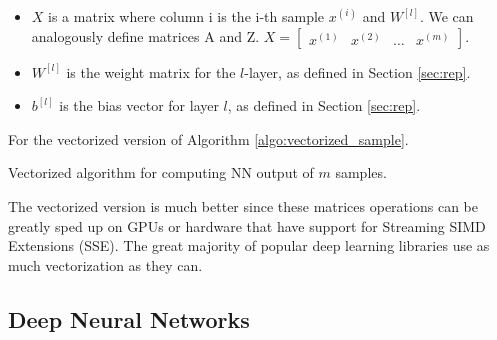 \begin{itemize}
    \item $X$ is a matrix where column i is the i-th sample $x^{(i)}$ and $W^{[l]}$. 
    We can analogously define matrices A and Z.
        $ X = \begin{bmatrix}
        x^{(1)} & x^{(2)} &  \dots  & x^{(m)} 
        \end{bmatrix}$.

    \item $W^{[l]}$ is the  weight matrix for the $l$-layer, as defined in Section \ref{sec:rep}. 
    \item $b^{[l]}$ is the bias vector for layer $l$, as defined in Section \ref{sec:rep}.
\end{itemize}

For the vectorized version of Algorithm \ref{algo:vectorized_sample}.

\begin{algorithm}[H]
    \DontPrintSemicolon
    \SetAlgoLined
    \caption{Vectorized algorithm for computing NN output of $m$ samples.}
    \label{algo:vectorized_sample}
\end{algorithm}

The vectorized version is much better since these matrices operations can be greatly sped up
on GPUs or hardware that have support for Streaming SIMD Extensions (SSE). The great majority of 
popular deep learning libraries use as much vectorization as they can.

\subsection{Deep Neural Networks}

